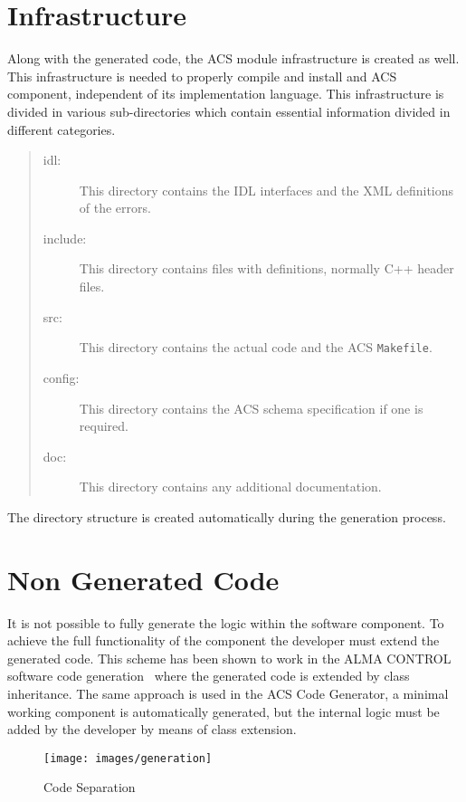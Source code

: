 \section{Infrastructure}
\label{sec:infrastructure}
Along with the generated code,
the ACS module infrastructure is created as well.
This infrastructure is needed to properly compile and install and
ACS component,
independent of its implementation language.
This infrastructure is divided in various sub-directories
which contain essential information divided in different categories.
\begin{quote}
  \begin{description}
  \item[idl:] This directory contains the IDL interfaces and the XML
    definitions of the errors.
  \item[include:] This directory contains files with definitions,
    normally C++ header files.
  \item[src:] This directory contains the actual code and the ACS
    \lstinline[language=sh]!Makefile!.
  \item[config:] This directory contains the ACS schema specification
    if one is required.
  \item[doc:] This directory contains any additional documentation.
  \end{description}
\end{quote}
The directory structure is created automatically during the generation process.

\section{Non Generated Code}
\label{sec:non-generated-code}
It is not possible to fully generate the logic within the software component.
To achieve the full functionality of the component the developer must extend the generated code.
This scheme has been shown to work in the ALMA CONTROL software code generation~%
\cite{farris07:_device_driver_code_gener_framew,%
      farris06:_generating_software_modules}
where the generated code is extended by class inheritance.
The same approach is used in the ACS Code Generator,
a minimal working component is automatically generated,
but the internal logic must be added by the developer by means of class extension.

\begin{figure}[htp]
  \begin{center}
  \texttt{[image: images/generation]}
  \end{center}
  \caption{Code Separation}
  \label{fg:generation}
\end{figure}

